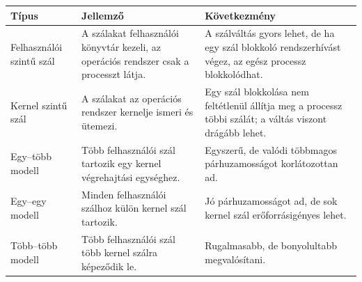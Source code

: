 \begin{tabularx}{\textwidth}{L{34mm}X X}
\toprule
\textbf{Típus} & \textbf{Jellemző} & \textbf{Következmény} \\
\midrule
Felhasználói szintű szál & A szálakat felhasználói könyvtár kezeli, az operációs rendszer csak a processzt látja. & A szálváltás gyors lehet, de ha egy szál blokkoló rendszerhívást végez, az egész processz blokkolódhat. \\
Kernel szintű szál & A szálakat az operációs rendszer kernelje ismeri és ütemezi. & Egy szál blokkolása nem feltétlenül állítja meg a processz többi szálát; a váltás viszont drágább lehet. \\
Egy--több modell & Több felhasználói szál tartozik egy kernel végrehajtási egységhez. & Egyszerű, de valódi többmagos párhuzamosságot korlátozottan ad. \\
Egy--egy modell & Minden felhasználói szálhoz külön kernel szál tartozik. & Jó párhuzamosságot ad, de sok kernel szál erőforrásigényes lehet. \\
Több--több modell & Több felhasználói szál több kernel szálra képeződik le. & Rugalmasabb, de bonyolultabb megvalósítani. \\
\bottomrule
\end{tabularx}
